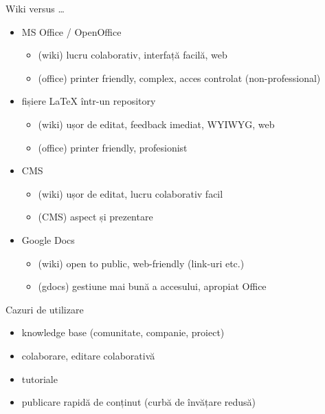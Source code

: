 \documentclass{beamer}
\begin{document}
\begin{frame}{Wiki versus \ldots}
  \begin{itemize}
    \pause \item MS Office / OpenOffice
      \begin{itemize}
        \pause \item (wiki) lucru colaborativ, interfață facilă, web
        \pause \item (office) printer friendly, complex, acces controlat
    (non-professional)
      \end{itemize}
    \pause \item fișiere LaTeX într-un repository
      \begin{itemize}
        \pause \item (wiki) ușor de editat, feedback imediat, WYIWYG, web
        \pause \item (office) printer friendly, profesionist
      \end{itemize}
    \pause \item CMS
      \begin{itemize}
        \pause \item (wiki) ușor de editat, lucru colaborativ facil
        \pause \item (CMS) aspect și prezentare
      \end{itemize}
    \pause \item Google Docs
      \begin{itemize}
        \pause \item (wiki) open to public, web-friendly (link-uri etc.)
        \pause \item (gdocs) gestiune mai bună a accesului, apropiat Office
      \end{itemize}
  \end{itemize}
\end{frame}

\begin{frame}{Cazuri de utilizare}
  \begin{itemize}
    \pause \item knowledge base (comunitate, companie, proiect)
    \pause \item colaborare, editare colaborativă
    \pause \item tutoriale
    \pause \item publicare rapidă de conținut (curbă de învățare redusă)
  \end{itemize}
\end{frame}
\end{document}
